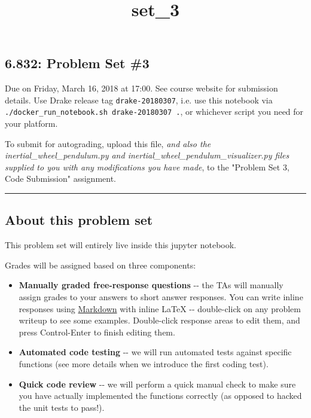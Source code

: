 \documentclass[11pt]{article}
\title{set\_3}
\providecommand{\tightlist}{%
      \setlength{\itemsep}{0pt}\setlength{\parskip}{0pt}}
\begin{document}
    
    
    \maketitle
    
    

    
    \subsection{6.832: Problem Set \#3}\label{problem-set-3}

Due on Friday, March 16, 2018 at 17:00. See course website for
submission details. Use Drake release tag \texttt{drake-20180307}, i.e.
use this notebook via
\texttt{./docker\_run\_notebook.sh\ drake-20180307\ .}, or whichever
script you need for your platform.

To submit for autograding, upload this file, \emph{and also the
inertial\_wheel\_pendulum.py and
inertial\_wheel\_pendulum\_visualizer.py files supplied to you with any
modifications you have made}, to the "Problem Set 3, Code Submission"
assignment.

\begin{center}\rule{0.5\linewidth}{\linethickness}\end{center}

    \subsection{About this problem set}\label{about-this-problem-set}

This problem set will entirely live inside this jupyter notebook.

Grades will be assigned based on three components:

\begin{itemize}
\tightlist
\item
  \textbf{Manually graded free-response questions} -\/- the TAs will
  manually assign grades to your answers to short answer responses. You
  can write inline responses using
  \href{https://github.com/adam-p/markdown-here/wiki/Markdown-Cheatsheet}{Markdown}
  with inline LaTeX -\/- double-click on any problem writeup to see some
  examples. Double-click response areas to edit them, and press
  Control-Enter to finish editing them.
\item
  \textbf{Automated code testing} -\/- we will run automated tests
  against specific functions (see more details when we introduce the
  first coding test).
\item
  \textbf{Quick code review} -\/- we will perform a quick manual check
  to make sure you have actually implemented the functions correctly (as
  opposed to hacked the unit tests to pass!).
\end{itemize}
\end{document}
